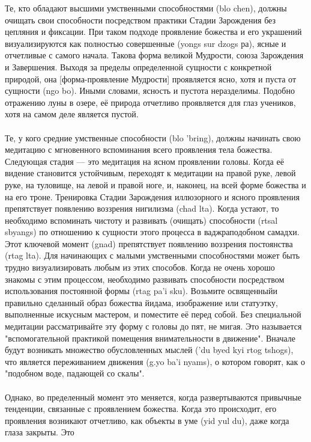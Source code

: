 Те, кто обладают высшими умственными способностями (blo chen), должны очищать
свои способности посредством практики Стадии Зарождения без цепляния и фиксации. При
таком подходе проявление божества и его украшений визуализируются как полностью
совершенные (yongs sur dzogs ра), ясные и отчетливые с самого начала. Такова форма
великой Мудрости, союза Зарождения и Завершения. Выходя за пределы определенной
сущности с конкретной природой, она [форма-проявление Мудрости] проявляется ясно, хотя
и пуста от сущности (ngo bo). Иными словами, ясность и пустота неразделимы. Подобно
отражению луны в озере, её природа отчетливо проявляется для глаз учеников, хотя на
самом деле является пустой.\\
\\
Те, у кого средние умственные способности (blo 'bring), должны начинать свою
медитацию с мгновенного вспоминания всего проявления тела божества. Следующая стадия
— это медитация на ясном проявлении головы. Когда её видение становится устойчивым,
переходят к медитации на правой руке, левой руке, на туловище, на левой и правой ноге, и,
наконец, на всей форме божества и на его троне. Тренировка Стадии Зарождения
иллюзорного и ясного проявления препятствует появлению воззрения нигилизма (chad lta).
Когда устают, то необходимо вспоминать чистоту и развивать (очищать) способности (rtsal
sbyangs) по отношению к сущности этого процесса в ваджраподобном самадхи. Этот
ключевой момент (gnad) препятствует появлению воззрения постоянства (rtag lta).
Для начинающих с малыми умственными способностями может быть трудно
визуализировать любым из этих способов. Когда не очень хорошо знакомы с этим
процессом, необходимо развивать способности посредством использования постоянной
формы (rtag pa'i sku). Возьмите освященныйи правильно сделанный образ божества йидама,
изображение или статуэтку, выполненные искусным мастером, и поместите её перед собой.
Без специальной медитации рассматривайте эту форму с головы до пят, не мигая. Это
называется "вспомогательной практикой помещения внимательности в движение". Вначале
будут возникать множество обусловленных мыслей ('du byed kyi rtog tshogs), что является
переживанием движения (g.yo ba'i nyams), о котором говорят, как о "подобном воде,
падающей со скалы".\\
\\
Однако, во пределенный момент это меняется, когда разверты\-ваются привычные
тенденции, связанные с проявлением божества. Когда это происходит, его проявления
возникают отчетливо, как объекты в уме (yid yul du), даже когда глаза закрыты. Это

